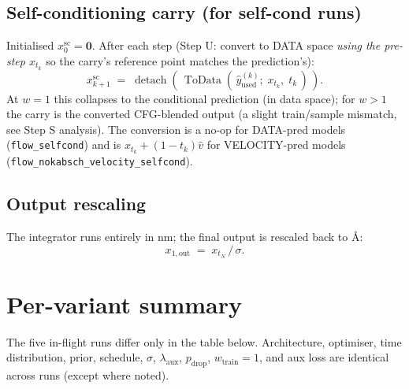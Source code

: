 \documentclass[11pt]{article}
\begin{document}
\subsection{Self-conditioning carry (for self-cond runs)}
Initialised $x^{\text{sc}}_0 = \mathbf{0}$. After each step (Step U: convert to DATA space \emph{using the pre-step $x_{t_k}$} so the carry's reference point matches the prediction's):
\begin{equation}
x^{\text{sc}}_{k+1} \;=\; \operatorname{detach}\!\left(\, \operatorname{ToData}\!\left(\,\hat{y}_{\text{used}}^{(k)};\; x_{t_k},\; t_k\,\right) \,\right).
\end{equation}
At $w=1$ this collapses to the conditional prediction (in data space); for $w>1$ the carry is the converted CFG-blended output (a slight train/sample mismatch, see Step S analysis). The conversion is a no-op for DATA-pred models (\texttt{flow\_selfcond}) and is $x_{t_k} + (1-t_k)\hat{v}$ for VELOCITY-pred models (\texttt{flow\_nokabsch\_velocity\_selfcond}).

\subsection{Output rescaling}
The integrator runs entirely in nm; the final output is rescaled back to \AA:
\begin{equation}
x_{1,\text{out}} \;=\; x_{t_N} \,/\, \sigma.
\end{equation}

\section{Per-variant summary}

The five in-flight runs differ only in the table below. Architecture, optimiser, time distribution, prior, schedule, $\sigma$, $\lambda_{\text{aux}}$, $p_{\text{drop}}$, $w_{\text{train}} = 1$, and aux loss are identical across runs (except where noted).
\end{document}
